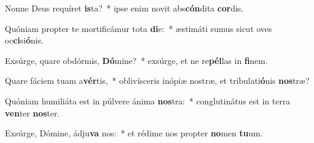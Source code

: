 \item Nonne Deus requíret \textbf{is}ta?~* ipse enim novit abs\textbf{cón}dita \textbf{cor}dis.
\item Quóniam propter te mortificámur tota \textbf{di}e:~* æstimáti sumus sicut oves oc\textbf{ci}si\textbf{ó}nis.
\item Exsúrge, quare obdórmis, \textbf{Dó}mine?~* exsúrge, et ne re\textbf{pél}las in \textbf{fi}nem.
\item Quare fáciem tuam a\textbf{vér}tis,~* oblivísceris inópiæ nostræ, et tribulati\textbf{ó}nis \textbf{nos}træ?
\item Quóniam humiliáta est in púlvere ánima \textbf{nos}tra:~* conglutinátus est in terra \textbf{ven}ter \textbf{nos}ter.
\item Exsúrge, Dómine, ádju\textbf{va} nos:~* et rédime nos propter \textbf{no}men \textbf{tu}um.

